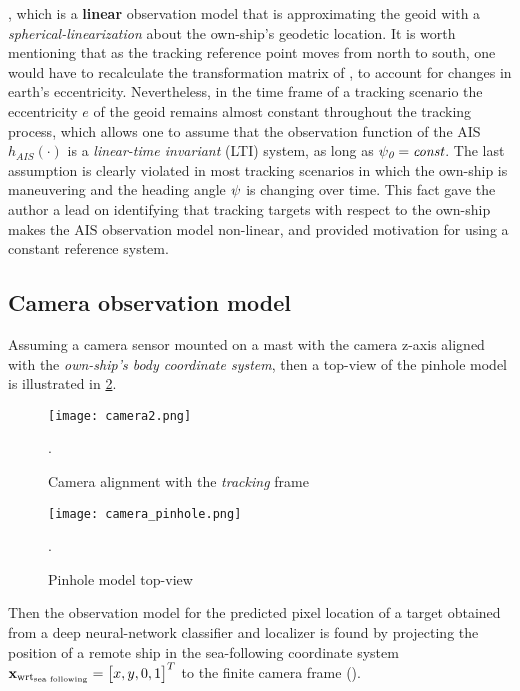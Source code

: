 , which is a \textbf{linear} observation model that is approximating the geoid with a \emph{spherical-linearization} about the own-ship's geodetic location. It is worth mentioning that as the tracking reference point moves from north to south, one would have to recalculate the transformation matrix of , to account for changes in earth's eccentricity. Nevertheless, in the time frame of a tracking scenario the eccentricity $e$ of the geoid remains almost constant throughout the tracking process, which allows one to assume that the observation function of the AIS $h_{\textit{AIS}}(\cdot)$ is a \emph{linear-time invariant} (LTI) system, as long as ${\psi}_{\textit{0}} = {\textit{const}} $. The last assumption is clearly violated in most tracking scenarios in which the own-ship is maneuvering and the heading angle ${\psi}$ is changing over time. This fact gave the author a lead on identifying that tracking targets with respect to the own-ship makes the $\text{AIS}$ observation model non-linear, and provided motivation for using a constant reference system.
\subsection{Camera observation model}


Assuming a camera sensor mounted on a mast with the camera z-axis aligned with the \emph{own-ship's body coordinate system}, then a top-view of the pinhole model is illustrated in \cref{fig:camera_pinhole}.



\begin{figure}[H]
	\centering
	\texttt{[image: camera2.png]}
	\caption{Camera alignment with the \emph{tracking} frame}.
	\label{fig:camera_alignment_tracking}
\end{figure}




\begin{figure}[H]
	\centering
	\texttt{[image: camera\_pinhole.png]}
	\caption{Pinhole model top-view}.
	\label{fig:camera_pinhole}
\end{figure}


Then the observation model for the predicted pixel location of a target obtained from a deep neural-network classifier and localizer is found by projecting the position of a remote ship in the sea-following coordinate system $\mathbf{x}_{\text{wrt}_{\text{sea following}}}=\begin{bmatrix}x, y, 0, 1\end{bmatrix}^T$ to the finite camera frame ().

